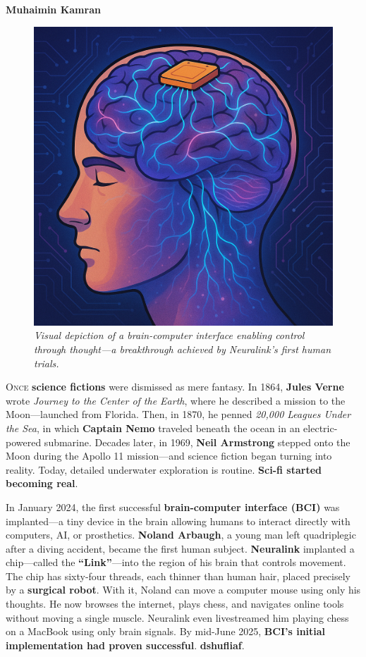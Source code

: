 \documentclass[a4paper,10pt,twocolumn]{memoir}
\newcommand{\article}[3]{
  \section*{#1}
  \addcontentsline{toc}{section}{#1}
  \begin{center}
    \color{dark}\normalsize\textbf{#2}\\
    \small\color{gray}#3
  \end{center}
  \vspace{-0.8em}  %
}
\begin{document}
{\article{}{Muhaimin Kamran}{}
\begin{figure}[h!]
  \centering
  \includegraphics[width=0.6\linewidth]{brainchip.png}
  \caption*{\textit{Visual depiction of a brain-computer interface enabling control through thought—a breakthrough achieved by Neuralink’s first human trials.}}
\end{figure}
\lettrine[lines=3]{O}{nce} \textbf{science fictions} were dismissed as mere fantasy. In 1864, \textbf{Jules Verne} wrote \textit{Journey to the Center of the Earth}, where he described a mission to the Moon—launched from Florida. Then, in 1870, he penned \textit{20,000 Leagues Under the Sea}, in which \textbf{Captain Nemo} traveled beneath the ocean in an electric-powered submarine. Decades later, in 1969, \textbf{Neil Armstrong} stepped onto the Moon during the Apollo 11 mission—and science fiction began turning into reality. Today, detailed underwater exploration is routine. \textbf{Sci-fi started becoming real}.

In January 2024, the first successful \textbf{brain-computer interface (BCI)} was implanted—a tiny device in the brain allowing humans to interact directly with computers, AI, or prosthetics. \textbf{Noland Arbaugh}, a young man left quadriplegic after a diving accident, became the first human subject. \textbf{Neuralink} implanted a chip—called the \textbf{“Link”}—into the region of his brain that controls movement. The chip has sixty-four threads, each thinner than human hair, placed precisely by a \textbf{surgical robot}. With it, Noland can move a computer mouse using only his thoughts. He now browses the internet, plays chess, and navigates online tools without moving a single muscle. Neuralink even livestreamed him playing chess on a MacBook using only brain signals. By mid-June 2025, \textbf{BCI’s initial implementation had proven successful}. \textbf{dshufliaf}. 

}
\end{document}
